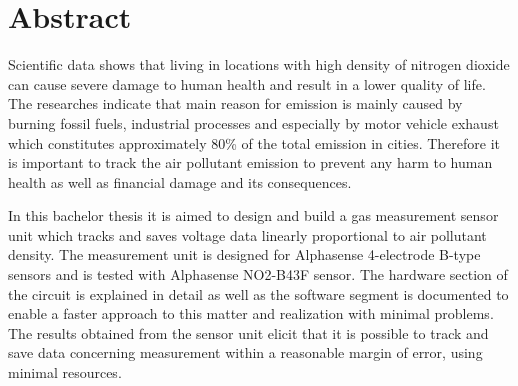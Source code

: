 \chapter*{Abstract}

Scientific data shows that living in locations with high density of nitrogen dioxide can cause severe damage to human health and result in a lower quality of life. The researches indicate that main reason for  emission is mainly caused by burning fossil fuels, industrial processes and especially by motor vehicle exhaust which constitutes approximately 80\% of the total  emission in cities. Therefore it is important to track the air pollutant emission to prevent any harm to human health as well as financial damage and its consequences.\par 
In this bachelor thesis it is aimed to design and build a gas measurement sensor unit which tracks and saves voltage data linearly proportional to air pollutant density. The measurement unit is designed for Alphasense 4-electrode B-type sensors and is tested with Alphasense NO2-B43F sensor. The hardware section of the circuit is explained in detail as well as the software segment is documented to enable a faster approach to this matter and realization with minimal problems. The results obtained from the sensor unit elicit that it is possible to track and save data concerning  measurement within a reasonable margin of error, using minimal resources.     

